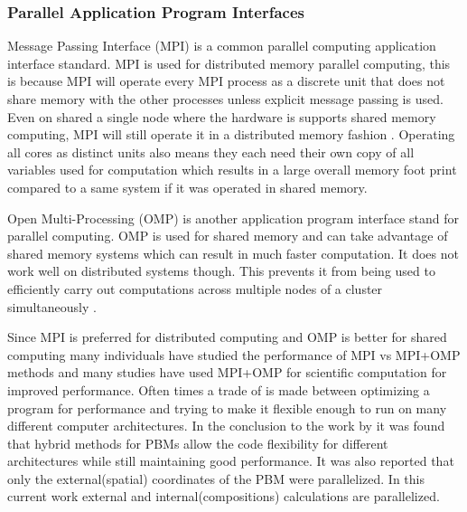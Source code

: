 \documentclass[preprint,11pt,authoryear]{elsarticle}
\begin{document}
\subsubsection{Parallel Application Program Interfaces}
\par Message Passing Interface (MPI) is a common parallel computing application interface standard. MPI is used for distributed memory parallel computing, this is because MPI will operate every MPI process as a discrete unit that does not share memory with the other processes unless explicit message passing is used. Even on shared a single node where the hardware is supports shared memory computing, MPI will still operate it in a distributed memory fashion \cite{Jin2011}. Operating all cores as distinct units also means they each need their own copy of all variables used for computation which results in a large overall memory foot print compared to a same system if it was operated in shared memory. 
\par Open Multi-Processing (OMP) is another application program interface stand for parallel computing. OMP is used for shared memory and can take advantage of shared memory systems which can result in much faster computation. It does not work well on distributed systems though. This prevents it from being used to efficiently carry out computations across multiple nodes of a cluster simultaneously \cite{Jin2011}. 
\par Since MPI is preferred for distributed computing and OMP is better for shared computing many individuals have studied the performance of MPI vs MPI+OMP methods and many studies have used MPI+OMP for scientific computation for improved performance. Often times a trade of is made between optimizing a program for performance and trying to make it flexible enough to run on many different computer architectures. In the conclusion to the work by \cite{Bettencourt2017} it was found that hybrid methods for PBMs allow the code flexibility for different architectures while still maintaining good performance.  It was also reported that only the external(spatial) coordinates of the PBM were parallelized. In this current work external and internal(compositions) calculations are parallelized.%
\end{document}
